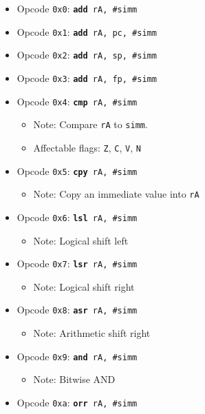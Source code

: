 \documentclass{article}
\begin{document}
	\singlespacing
	\begin{itemize}
		\item Opcode \texttt{0x0}:
			\texttt{\textbf{add} rA, \#simm}
		\item Opcode \texttt{0x1}:
			\texttt{\textbf{add} rA, pc, \#simm}
		\item Opcode \texttt{0x2}:
			\texttt{\textbf{add} rA, sp, \#simm}
		\item Opcode \texttt{0x3}:
			\texttt{\textbf{add} rA, fp, \#simm}
		\item Opcode \texttt{0x4}:
			\texttt{\textbf{cmp} rA, \#simm}
		\begin{itemize}
			\item Note: Compare \texttt{rA} to \texttt{simm}.
			\item Affectable flags:
				\texttt{Z}, \texttt{C}, \texttt{V}, \texttt{N}
		\end{itemize}
		\item Opcode \texttt{0x5}:
			\texttt{\textbf{cpy} rA, \#simm}
		\begin{itemize}
			\item Note: Copy an immediate value into \texttt{rA}
		\end{itemize}
		\item Opcode \texttt{0x6}:
			\texttt{\textbf{lsl} rA, \#simm}
		\begin{itemize}
			\item Note: Logical shift left
		\end{itemize}
		\item Opcode \texttt{0x7}:
			\texttt{\textbf{lsr} rA, \#simm}
		\begin{itemize}
			\item Note: Logical shift right
		\end{itemize}
		\item Opcode \texttt{0x8}:
			\texttt{\textbf{asr} rA, \#simm}
		\begin{itemize}
			\item Note: Arithmetic shift right
		\end{itemize}
		\item Opcode \texttt{0x9}:
			\texttt{\textbf{and} rA, \#simm}
		\begin{itemize}
			\item Note: Bitwise AND
		\end{itemize}
		\item Opcode \texttt{0xa}:
			\texttt{\textbf{orr} rA, \#simm}

\end{itemize}
\end{document}
